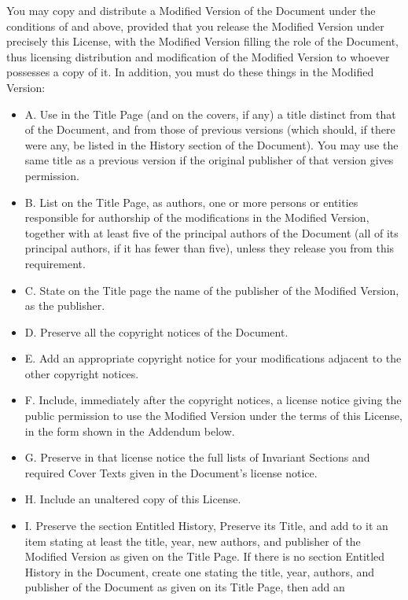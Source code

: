 \documentclass[10pt,english]{article}
\begin{document}
You may copy and distribute a Modified Version of the Document under
the conditions of  and 
above, provided that you release the Modified Version under precisely
this License, with the Modified Version filling the role of the Document,
thus licensing distribution and modification of the Modified Version
to whoever possesses a copy of it. In addition, you must do these
things in the Modified Version:
\begin{itemize}
\item A. Use in the Title Page (and on the covers, if any) a title distinct
from that of the Document, and from those of previous versions (which
should, if there were any, be listed in the History section of the
Document). You may use the same title as a previous version if the
original publisher of that version gives permission.
\item B. List on the Title Page, as authors, one or more persons or entities
responsible for authorship of the modifications in the Modified Version,
together with at least five of the principal authors of the Document
(all of its principal authors, if it has fewer than five), unless
they release you from this requirement.
\item C. State on the Title page the name of the publisher of the Modified
Version, as the publisher.
\item D. Preserve all the copyright notices of the Document.
\item E. Add an appropriate copyright notice for your modifications adjacent
to the other copyright notices.
\item F. Include, immediately after the copyright notices, a license notice
giving the public permission to use the Modified Version under the
terms of this License, in the form shown in the Addendum below.
\item G. Preserve in that license notice the full lists of Invariant Sections
and required Cover Texts given in the Document's license notice.
\item H. Include an unaltered copy of this License.
\item I. Preserve the section Entitled \textquotedbl{}History\textquotedbl{},
Preserve its Title, and add to it an item stating at least the title,
year, new authors, and publisher of the Modified Version as given
on the Title Page. If there is no section Entitled \textquotedbl{}History\textquotedbl{}
in the Document, create one stating the title, year, authors, and
publisher of the Document as given on its Title Page, then add an

\end{itemize}
\end{document}
